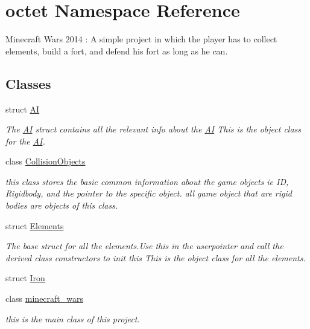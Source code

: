 \hypertarget{namespaceoctet}{\section{octet Namespace Reference}
\label{namespaceoctet}
}


Minecraft Wars 2014 \+: A simple project in which the player has to collect elements, build a fort, and defend his fort as long as he can.  


\subsection*{Classes}
\begin{DoxyCompactItemize}
\item 
struct \hyperlink{structoctet_1_1_a_i}{A\+I}
\begin{DoxyCompactList}\small\item\em The \hyperlink{structoctet_1_1_a_i}{A\+I} struct contains all the relevant info about the \hyperlink{structoctet_1_1_a_i}{A\+I} This is the object class for the \hyperlink{structoctet_1_1_a_i}{A\+I}. \end{DoxyCompactList}\item 
class \hyperlink{classoctet_1_1_collision_objects}{Collision\+Objects}
\begin{DoxyCompactList}\small\item\em this class stores the basic common information about the game objects ie I\+D, Rigidbody, and the pointer to the specific object. all game object that are rigid bodies are objects of this class. \end{DoxyCompactList}\item 
struct \hyperlink{structoctet_1_1_elements}{Elements}
\begin{DoxyCompactList}\small\item\em The base struct for all the elements.\+Use this in the userpointer and call the derived class constructors to init this This is the object class for all the elements. \end{DoxyCompactList}\item 
struct \hyperlink{structoctet_1_1_iron}{Iron}
\item 
class \hyperlink{classoctet_1_1minecraft__wars}{minecraft\+\_\+wars}
\begin{DoxyCompactList}\small\item\em this is the main class of this project. \end{DoxyCompactList}\item 

\end{DoxyCompactItemize}
